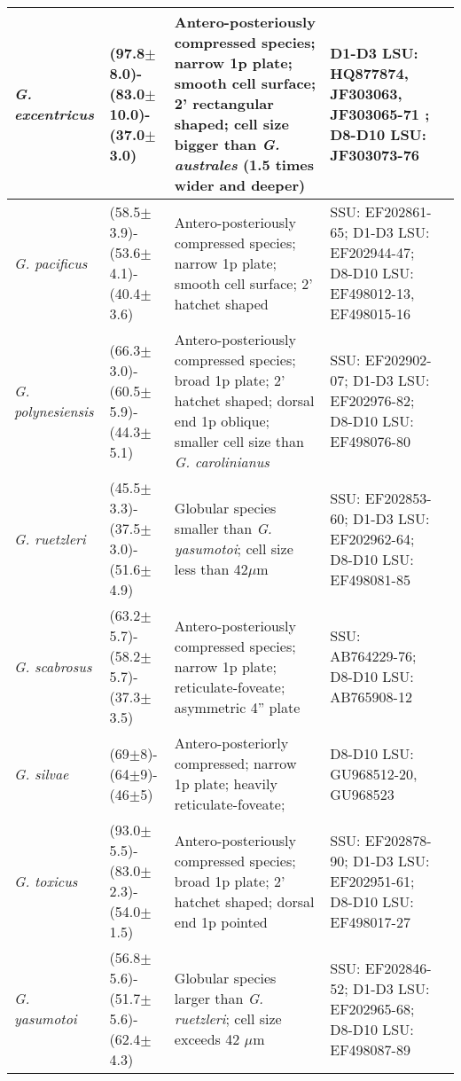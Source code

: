 \documentclass[12pt]{article}
\begin{document}
\begin{longtable}{ |  p{2cm} | p{2.7cm} | p{4.5cm} | p{3.1cm} | p{1cm} | }
\hline
  \emph{G. excentricus} & (97.8$\pm$8.0)-(83.0$\pm$10.0)-(37.0$\pm$3.0) & Antero-posteriously compressed species; narrow 1p plate; smooth cell surface; 2’ rectangular shaped; cell size bigger than \emph{G. australes} (1.5 times wider and deeper) & D1-D3 LSU: HQ877874, JF303063, JF303065-71 ; D8-D10 LSU: JF303073-76  & \cite{litaker2009taxonomy} \\
\hline
  \emph{G. pacificus} & (58.5$\pm$3.9)-(53.6$\pm$4.1)-(40.4$\pm$3.6) & Antero-posteriously compressed species; narrow 1p plate; smooth cell surface; 2' hatchet shaped & SSU: EF202861-65; D1-D3 LSU: EF202944-47; D8-D10 LSU: EF498012-13, EF498015-16  & \cite{litaker2009taxonomy,chinain1999morphology} \\
\hline
 \emph{G. polynesiensis} & (66.3$\pm$3.0)-(60.5$\pm$5.9)-(44.3$\pm$5.1) & Antero-posteriously compressed species; broad 1p plate; 2’ hatchet shaped; dorsal end 1p oblique; smaller cell size than \emph{G. carolinianus} & SSU: EF202902-07; D1-D3 LSU: EF202976-82; D8-D10 LSU: EF498076-80  & \cite{litaker2009taxonomy,chinain1999morphology} \\
\hline 
 \emph{G. ruetzleri} & (45.5$\pm$3.3)-(37.5$\pm$3.0)-(51.6$\pm$4.9) & Globular species smaller than \emph{G. yasumotoi}; cell size less than 42$\mu$m & SSU: EF202853-60; D1-D3 LSU: EF202962-64; D8-D10 LSU: EF498081-85 & \cite{litaker2009taxonomy} \\
 \hline
 \emph{G. scabrosus} & (63.2$\pm$5.7)-(58.2$\pm$5.7)-(37.3$\pm$3.5) & Antero-posteriously compressed species; narrow 1p plate; reticulate-foveate; asymmetric 4'' plate & SSU: AB764229-76; D8-D10 LSU: AB765908-12  & \cite{nishimura2013genetic,nishimura2014morphology,kuno2010genetic} \\ %
\hline
\emph{G. silvae} & (69$\pm$8)-(64$\pm$9)-(46$\pm$5)  & Antero-posteriorly  compressed; narrow 1p plate; heavily reticulate-foveate; & D8-D10 LSU: GU968512-20, GU968523 & \cite{litaker2010global,fraga2014genus} \\
\hline
 \emph{G. toxicus} & (93.0$\pm$5.5)-(83.0$\pm$2.3)-(54.0$\pm$1.5) & Antero-posteriously compressed species; broad 1p plate; 2’ hatchet shaped; dorsal end 1p pointed & SSU: EF202878-90; D1-D3 LSU: EF202951-61; D8-D10 LSU: EF498017-27 & \cite{litaker2009taxonomy,adachi1979thecal,chinain1997intraspecific,richlen2008phylogeography} \\
 \hline
  \emph{G. yasumotoi} & (56.8$\pm$5.6)-(51.7$\pm$5.6)-(62.4$\pm$4.3) & Globular species larger than \emph{G. ruetzleri}; cell size exceeds 42 $\mu$m & SSU: EF202846-52; D1-D3 LSU: EF202965-68; D8-D10 LSU: EF498087-89 & \cite{holmes1998gambierdiscus,litaker2009taxonomy} \\

\end{longtable}
\end{document}
